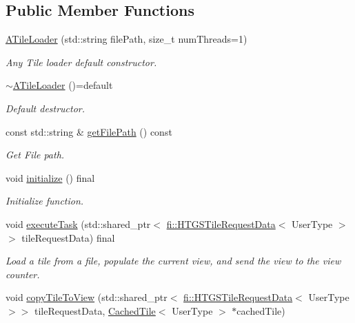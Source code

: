 \subsection*{Public Member Functions}
\begin{DoxyCompactItemize}
\item 
\hyperlink{classfi_1_1ATileLoader_a853a3209bab3a5e024f9d1ca7c8933f3}{A\+Tile\+Loader} (std\+::string file\+Path, size\+\_\+t num\+Threads=1)
\begin{DoxyCompactList}\small\item\em Any Tile loader default constructor. \end{DoxyCompactList}\item 
\hyperlink{classfi_1_1ATileLoader_ab04d8b3add3187cfa57a0f5323f8f7b4}{$\sim$\+A\+Tile\+Loader} ()=default
\begin{DoxyCompactList}\small\item\em Default destructor. \end{DoxyCompactList}\item 
const std\+::string \& \hyperlink{classfi_1_1ATileLoader_a5efe3a55a89531b4ef657e58e5753340}{get\+File\+Path} () const
\begin{DoxyCompactList}\small\item\em Get File path. \end{DoxyCompactList}\item 
void \hyperlink{classfi_1_1ATileLoader_a12929a1a82ff9cf2615e7a7420ba92c4}{initialize} () final
\begin{DoxyCompactList}\small\item\em Initialize function. \end{DoxyCompactList}\item 
void \hyperlink{classfi_1_1ATileLoader_ab3fb2e90d11d160e89c6b8a7df684c7f}{execute\+Task} (std\+::shared\+\_\+ptr$<$ \hyperlink{classfi_1_1HTGSTileRequestData}{fi\+::\+H\+T\+G\+S\+Tile\+Request\+Data}$<$ User\+Type $>$$>$ tile\+Request\+Data) final
\begin{DoxyCompactList}\small\item\em Load a tile from a file, populate the current view, and send the view to the view counter. \end{DoxyCompactList}\item 
void \hyperlink{classfi_1_1ATileLoader_a69b1eaf0e9f636f756f514bd985a4cb5}{copy\+Tile\+To\+View} (std\+::shared\+\_\+ptr$<$ \hyperlink{classfi_1_1HTGSTileRequestData}{fi\+::\+H\+T\+G\+S\+Tile\+Request\+Data}$<$ User\+Type $>$$>$ tile\+Request\+Data, \hyperlink{classfi_1_1CachedTile}{Cached\+Tile}$<$ User\+Type $>$ $\ast$cached\+Tile)

\end{DoxyCompactItemize}
